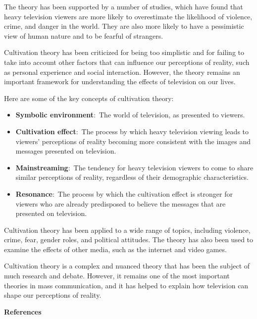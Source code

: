 \documentclass[
  b5paper]{book}
\begin{document}
The theory has been supported by a number of studies, which have found that heavy television viewers are more likely to overestimate the likelihood of violence, crime, and danger in the world. They are also more likely to have a pessimistic view of human nature and to be fearful of strangers.

Cultivation theory has been criticized for being too simplistic and for failing to take into account other factors that can influence our perceptions of reality, such as personal experience and social interaction. However, the theory remains an important framework for understanding the effects of television on our lives.

Here are some of the key concepts of cultivation theory:

\begin{itemize}
\item
  \textbf{Symbolic environment}:~The world of television, as presented to viewers.
\item
  \textbf{Cultivation effect}:~The process by which heavy television viewing leads to viewers' perceptions of reality becoming more consistent with the images and messages presented on television.
\item
  \textbf{Mainstreaming}:~The tendency for heavy television viewers to come to share similar perceptions of reality, regardless of their demographic characteristics.
\item
  \textbf{Resonance}:~The process by which the cultivation effect is stronger for viewers who are already predisposed to believe the messages that are presented on television.
\end{itemize}

Cultivation theory has been applied to a wide range of topics, including violence, crime, fear, gender roles, and political attitudes. The theory has also been used to examine the effects of other media, such as the internet and video games.

Cultivation theory is a complex and nuanced theory that has been the subject of much research and debate. However, it remains one of the most important theories in mass communication, and it has helped to explain how television can shape our perceptions of reality.

\textbf{References}
\end{document}

